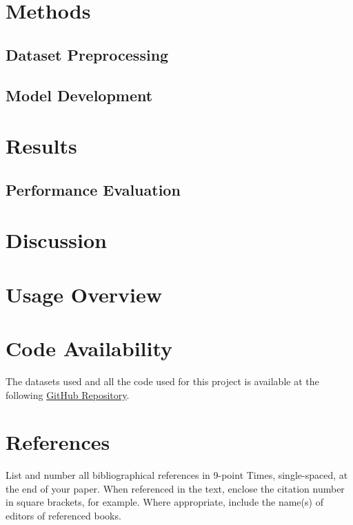 \documentclass[10pt,twocolumn,letterpaper]{article}
\begin{document}
\section{Methods}

\subsection{Dataset Preprocessing}

\subsection{Model Development}



\section{Results}

\subsection{Performance Evaluation}

\section{Discussion}

\section{Usage Overview}

\section{Code Availability}
The datasets used and all the code used for this project is available
at the following \href{https://github.com/marcouderzo/BioData-ProteinFunctionPrediction}{GitHub Repository}.



\section{References}

List and number all bibliographical references in 9-point Times,
single-spaced, at the end of your paper. When referenced in the text,
enclose the citation number in square brackets, for
example.  Where appropriate, include the name(s) of
editors of referenced books.

%
%
\end{document}
